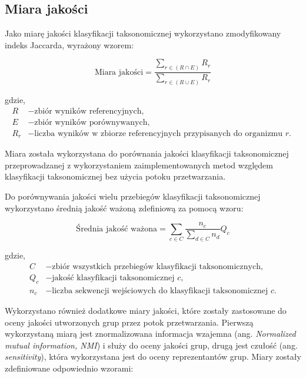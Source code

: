     \subsection{Miara jakości}

        Jako miarę jakości klasyfikacji taksonomicznej wykorzystano zmodyfikowany indeks Jaccarda, wyrażony wzorem:

        \begin{equation}
            \text{Miara jakości} = \frac{
                \sum_{r \in (R \cap E)} R_{r}
            }{
                \sum_{r \in (R \cup E)} R_{r}
            }
            \label{Equation:Quality}
        \end{equation}

        gdzie,
        \begin{align*}
            R &- \text{zbiór wyników referencyjnych,} \\
            E &- \text{zbiór wyników porównywanych,} \\
            R_{r} &- \text{liczba wyników w zbiorze referencyjnych przypisanych do organizmu $r$. }
        \end{align*}

        Miara została wykorzystana do porównania jakości klasyfikacji taksonomicznej przeprowadzanej z wykorzystaniem zaimplementowanych metod względem klasyfikacji taksonomicznej bez użycia potoku przetwarzania.

        Do porównywania jakości wielu przebiegów klasyfikacji taksonomicznej wykorzystano średnią jakość ważoną zdefiniową za pomocą wzoru:

        \begin{equation}
            \text{Średnia jakość ważona} = \sum_{c \in C} \frac{n_c}{\sum_{d \in C} n_d} Q_c
            \label{Equation:WeightedAverageQuality}
        \end{equation}

        gdzie,
        \begin{align*}
            C &- \text{zbiór wszystkich przebiegów klasyfikacji taksonomicznych,} \\
            Q_c &- \text{jakość klasyfikacji taksonomicznej $c$,} \\
            n_c &- \text{liczba sekwencji wejściowych do klasyfikacji taksonomicznej $c$.}
        \end{align*}

        Wykorzystano również dodatkowe miary jakości, które zostały zastosowane do oceny jakości utworzonych grup przez potok przetwarzania. Pierwszą wykorzystaną miarą jest znormalizowana informacja wzajemna (ang. \textit{Normalized mutual information, NMI}) i służy do oceny jakości grup, drugą jest czułość (ang. \textit{sensitivity}), która wykorzystana jest do oceny reprezentantów grup. Miary zostały zdefiniowane odpowiednio wzorami:

